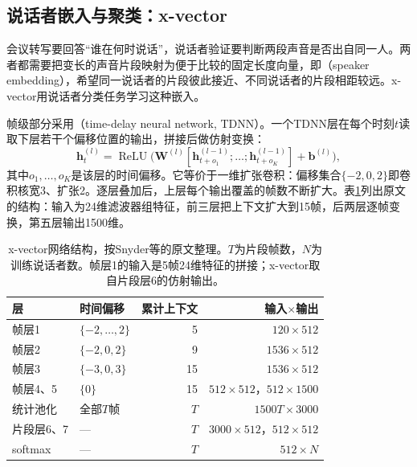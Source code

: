 \subsection{说话者嵌入与聚类：x-vector}
\label{sec:nlp-speech-xvector}

会议转写要回答“谁在何时说话”，说话者验证要判断两段声音是否出自同一人。两者都需要把变长的声音片段映射为便于比较的固定长度向量，即（speaker embedding），希望同一说话者的片段彼此接近、不同说话者的片段相距较远。x-vector用说话者分类任务学习这种嵌入。

帧级部分采用（time-delay neural network, TDNN）。一个TDNN层在每个时刻$t$读取下层若干个偏移位置的输出，拼接后做仿射变换：
\begin{equation}
 \bm{h}^{(l)}_t=\operatorname{ReLU}\bigl(\bm{W}^{(l)}[\bm{h}^{(l-1)}_{t+o_1};\ldots;\bm{h}^{(l-1)}_{t+o_K}]+\bm{b}^{(l)}\bigr),
 \label{eq:nlp-speech-tdnn}
\end{equation}
其中$o_1,\ldots,o_K$是该层的时间偏移。它等价于一维扩张卷积：偏移集合$\{-2,0,2\}$即卷积核宽3、扩张2。逐层叠加后，上层每个输出覆盖的帧数不断扩大。表\ref{tab:nlp-speech-xvector}列出原文的结构：输入为24维滤波器组特征，前三层把上下文扩大到15帧，后两层逐帧变换，第五层输出1500维。

\begin{table}[htbp]
  \centering
  \small
  \begin{tabular}{@{}llrr@{}}
    \toprule
    层 & 时间偏移 & 累计上下文 & 输入$\times$输出\\
    \midrule
    帧层1 & $\{-2,\ldots,2\}$ & 5 & $120\times512$\\
    帧层2 & $\{-2,0,2\}$ & 9 & $1536\times512$\\
    帧层3 & $\{-3,0,3\}$ & 15 & $1536\times512$\\
    帧层4、5 & $\{0\}$ & 15 & $512\times512$，$512\times1500$\\
    统计池化 & 全部$T$帧 & $T$ & $1500T\times3000$\\
    片段层6、7 & --- & $T$ & $3000\times512$，$512\times512$\\
    softmax & --- & $T$ & $512\times N$\\
    \bottomrule
  \end{tabular}
  \caption{x-vector网络结构，按Snyder等的原文整理。$T$为片段帧数，$N$为训练说话者数。帧层1的输入是5帧24维特征的拼接；x-vector取自片段层6的仿射输出。}
  \label{tab:nlp-speech-xvector}
\end{table}

